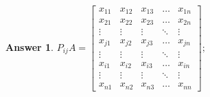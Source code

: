 \documentclass[11pt,leqno]{article}
\newcommand{\<}[1]{{\langle}#1 {\rangle}}
\theoremstyle{plain}
\newtheorem*{answer*}{Answer}
\theoremstyle{definition}
\theoremstyle{remark}
\numberwithin{equation}{section}
\begin{document}
\begin{enumerate}
\begin{itemize}
\begin{answer*}
                        $P_{ij}A=\begin{bmatrix}
                            x_{11} & x_{12} & x_{13} & \dots  & x_{1n} \\
                            x_{21} & x_{22} & x_{23} & \dots  & x_{2n} \\
                            \vdots & \vdots & \vdots & \ddots & \vdots \\
                            x_{j1} & x_{j2} & x_{j3} & \dots  & x_{jn} \\                            
                            \vdots & \vdots & \vdots & \ddots & \vdots \\
                            x_{i1} & x_{i2} & x_{i3} & \dots  & x_{in} \\
                            \vdots & \vdots & \vdots & \ddots & \vdots \\
                            x_{n1} & x_{n2} & x_{n3} & \dots  & x_{nn}
                            \end{bmatrix};$
                            

\end{answer*}
\end{itemize}
\end{enumerate}
\end{document}
